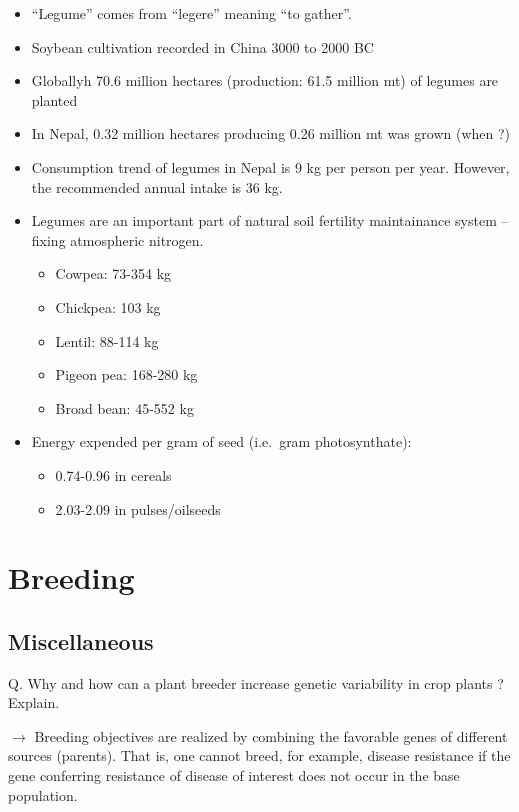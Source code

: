 \documentclass[
  openany]{book}
\providecommand{\tightlist}{%
  \setlength{\itemsep}{0pt}\setlength{\parskip}{0pt}}
\begin{document}
\begin{itemize}
\tightlist
\item
  ``Legume'' comes from ``legere'' meaning ``to gather''.
\item
  Soybean cultivation recorded in China 3000 to 2000 BC
\item
  Globallyh 70.6 million hectares (production: 61.5 million mt) of legumes are planted
\item
  In Nepal, 0.32 million hectares producing 0.26 million mt was grown (when ?)
\item
  Consumption trend of legumes in Nepal is 9 kg per person per year. However, the recommended annual intake is 36 kg.
\item
  Legumes are an important part of natural soil fertility maintainance system -- fixing atmospheric nitrogen.

  \begin{itemize}
  \tightlist
  \item
    Cowpea: 73-354 kg
  \item
    Chickpea: 103 kg
  \item
    Lentil: 88-114 kg
  \item
    Pigeon pea: 168-280 kg
  \item
    Broad bean: 45-552 kg
  \end{itemize}
\item
  Energy expended per gram of seed (i.e.~gram photosynthate):

  \begin{itemize}
  \tightlist
  \item
    0.74-0.96 in cereals
  \item
    2.03-2.09 in pulses/oilseeds
  \end{itemize}
\end{itemize}

\hypertarget{breeding}{%
\chapter{Breeding}\label{breeding}}

\hypertarget{miscellaneous-1}{%
\section{Miscellaneous}\label{miscellaneous-1}}

Q. Why and how can a plant breeder increase genetic variability in crop plants ? Explain.

\(\longrightarrow\) Breeding objectives are realized by combining the favorable genes of different sources (parents). That is, one cannot breed, for example, disease resistance if the gene conferring resistance of disease of interest does not occur in the base population.
\end{document}
